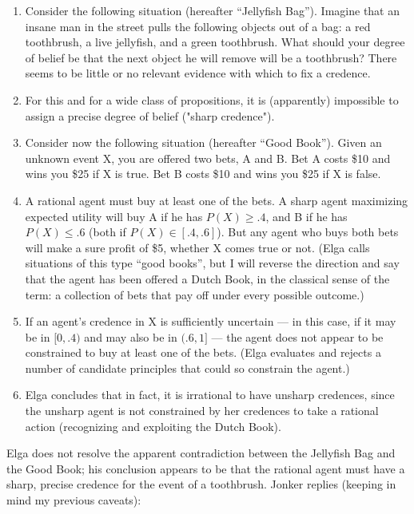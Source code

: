 \documentclass[letterpaper,12pt]{article}
\begin{document}
\begin{enumerate}
\item
Consider the following situation (hereafter ``Jellyfish Bag''). Imagine that an insane man in the street pulls the following objects out of a bag: a red toothbrush, a live jellyfish, and a green toothbrush. What should your degree of belief be that the next object he will remove will be a toothbrush? There seems to be little or no relevant evidence with which to fix a credence.
\item
For this and for a wide class of propositions, it is (apparently) impossible to assign a precise degree of belief ("sharp credence").
\item
Consider now the following situation (hereafter ``Good Book''). Given an unknown event X, you are offered two bets, A and B. Bet A costs \$10 and wins you \$25 if X is true. Bet B costs \$10 and wins you \$25 if X is false.
\item
A rational agent must buy at least one of the bets. A sharp agent maximizing expected utility will buy A if he has $P(X) \geq .4$, and B if he has $P(X) \leq .6$ (both if $P(X) \in [.4, .6]$). But any agent who buys both bets will make a sure profit of \$5, whether X comes true or not. (Elga calls situations of this type ``good books'', but I will reverse the direction and say that the agent has been offered a Dutch Book, in the classical sense of the term: a collection of bets that pay off under every possible outcome.)
\item
If an agent's credence in X is sufficiently uncertain --- in this case, if it may be in $[0, .4)$ and may also be in $(.6, 1]$ --- the agent does not appear to be constrained to buy at least one of the bets. (Elga evaluates and rejects a number of candidate principles that could so constrain the agent.)
\item
Elga concludes that in fact, it is irrational to have unsharp credences, since the unsharp agent is not constrained by her credences to take a rational action (recognizing and exploiting the Dutch Book).
\end{enumerate}

Elga does not resolve the apparent contradiction between the Jellyfish Bag and the Good Book; his conclusion appears to be that the rational agent must have a sharp, precise credence for the event of a toothbrush. Jonker \citeyearpar{jonker2012} replies (keeping in mind my previous caveats):
\end{document}
